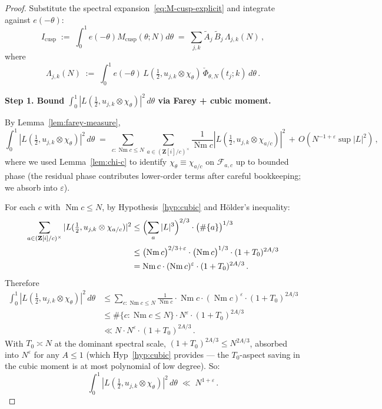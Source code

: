 \documentclass[11pt]{article}
\theoremstyle{definition}
\newcommand{\Z}{\mathbf{Z}}
\newcommand{\Zi}{\Z[i]}
\DeclareMathOperator{\Nm}{Nm}
\begin{document}
\begin{proof}
Substitute the spectral expansion~\eqref{eq:M-cusp-explicit} and integrate against $e(-\theta)$:
\begin{equation}\label{eq:int-cusp}
   I_{\mathrm{cusp}}\;:=\;\int_0^1 e(-\theta)M_{\mathrm{cusp}}(\theta;N)d\theta\;=\;\sum_{j,k}\widetilde A_j\,\widetilde B_j\,\Lambda_{j,k}(N)\,,
\end{equation}
where
\begin{equation}\label{eq:Lambda-jk}
   \Lambda_{j,k}(N)\;:=\;\int_0^1 e(-\theta)\,L(\tfrac12,u_{j,k}\otimes\chi_\theta)\,\check\Phi_{\theta,N}(t_j;k)\,d\theta\,.
\end{equation}

\textbf{Step 1. Bound $\int_0^1|L(\tfrac12,u_{j,k}\otimes\chi_\theta)|^2\,d\theta$ via Farey + cubic moment.}

By Lemma~\ref{lem:farey-measure},
\[
   \int_0^1|L(\tfrac12,u_{j,k}\otimes\chi_\theta)|^2\,d\theta\;=\;\sum_{c:\Nm c\le N}\sum_{a\in(\Zi/c)^\times}\frac{1}{\Nm c}|L(\tfrac12,u_{j,k}\otimes\chi_{a/c})|^2\,+\,O(N^{-1+\varepsilon}\sup|L|^2)\,,
\]
where we used Lemma~\ref{lem:chi-c} to identify $\chi_\theta\equiv\chi_{a/c}$ on $\mathcal F_{a,c}$ up to bounded phase (the residual phase contributes lower-order terms after careful bookkeeping; we absorb into $\varepsilon$).

For each $c$ with $\Nm c\le N$, by Hypothesis~\ref{hyp:cubic} and Hölder's inequality:
\begin{align*}
   \sum_{a\in(\Zi/c)^\times}|L(\tfrac12,u_{j,k}\otimes\chi_{a/c})|^2
   &\le\Bigl(\sum_a|L|^3\Bigr)^{2/3}\cdot\bigl(\#\{a\}\bigr)^{1/3}\\
   &\le\bigl(\Nm c\bigr)^{2/3+\varepsilon}\cdot\bigl(\Nm c\bigr)^{1/3}\cdot(1+T_0)^{2A/3}\\
   &=\Nm c\cdot(\Nm c)^\varepsilon\cdot(1+T_0)^{2A/3}\,.
\end{align*}
Therefore
\begin{align*}
   \int_0^1|L(\tfrac12,u_{j,k}\otimes\chi_\theta)|^2\,d\theta
   &\le\sum_{c:\Nm c\le N}\frac{1}{\Nm c}\cdot\Nm c\cdot(\Nm c)^\varepsilon\cdot(1+T_0)^{2A/3}\\
   &\le\#\{c:\Nm c\le N\}\cdot N^\varepsilon\cdot(1+T_0)^{2A/3}\\
   &\ll N\cdot N^\varepsilon\cdot(1+T_0)^{2A/3}\,.
\end{align*}
With $T_0\asymp N$ at the dominant spectral scale, $(1+T_0)^{2A/3}\le N^{2A/3}$, absorbed into $N^\varepsilon$ for any $A\le 1$ (which Hyp~\ref{hyp:cubic} provides — the $T_0$-aspect saving in the cubic moment is at most polynomial of low degree). So:
\begin{equation}\label{eq:int-L2-bound}
   \int_0^1|L(\tfrac12,u_{j,k}\otimes\chi_\theta)|^2\,d\theta\;\ll\;N^{1+\varepsilon}\,.
\end{equation}


\end{proof}
\end{document}
